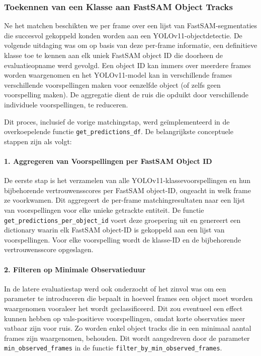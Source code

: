 \subsubsection{Toekennen van een Klasse aan FastSAM Object Tracks}

Ne het matchen beschikten we per frame over een lijst van FastSAM-segmentaties die 
succesvol gekoppeld konden worden aan een YOLOv11-objectdetectie.
De volgende uitdaging was om op basis van deze per-frame informatie, een definitieve klasse toe te kennen aan elk uniek FastSAM object ID
die doorheen de evaluatieopname werd gevolgd.
Een object ID kan immers over meerdere frames worden waargenomen 
en het YOLOv11-model kan in verschillende frames verschillende voorspellingen maken voor eenzelfde object (of zelfs geen voorspelling maken).
De aggregatie dient de ruis die opduikt door verschillende individuele voorspellingen, te reduceren.

Dit proces, inclusief de vorige matchingstap, werd geïmplementeerd in de overkoepelende functie \texttt{get\_predictions\_df}.
De belangrijkste conceptuele stappen zijn als volgt:

\paragraph{1. Aggregeren van Voorspellingen per FastSAM Object ID}
De eerste stap is het verzamelen van alle YOLOv11-klassevoorspellingen en hun bijbehorende 
vertrouwensscores per FastSAM object-ID, 
ongeacht in welk frame ze voorkwamen. 
Dit aggregeert de per-frame matchingresultaten naar een lijst van voorspellingen voor elke unieke getrackte entiteit. 
De functie \texttt{get\_predictions\_per\_object\_id} voert deze groepering uit en genereert een dictionary waarin elk FastSAM object-ID is gekoppeld aan een lijst van voorspellingen.
Voor elke voorspelling wordt de klasse-ID en de bijbehorende vertrouwensscore opgeslagen.

\paragraph{2. Filteren op Minimale Observatieduur}
In de latere evaluatiestap werd ook onderzocht of het zinvol was om een parameter te introduceren die bepaalt in hoeveel frames een object moet worden waargenomen
vooraleer het wordt geclassificeerd. Dit zou eventueel een effect kunnen hebben op vals-positieve voorspellingen, omdat korte observaties meer vatbaar zijn voor ruis.
Zo worden enkel object tracks die in een minimaal aantal frames zijn waargenomen, behouden.
Dit wordt aangedreven door de parameter \texttt{min\_observed\_frames} in de functie \texttt{filter\_by\_min\_observed\_frames}.

